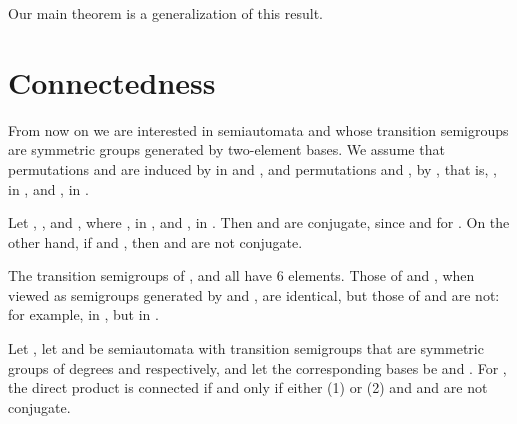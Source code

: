 \documentclass{llncs}
\newcommand{\qedb}{\hfill}
\begin{document}
Our main theorem is a generalization of this result.
\section{Connectedness}
\label{sec:connect}

From now on we are interested in semiautomata  and  whose transition semigroups are symmetric groups generated by two-element bases.
We assume that permutations  and  are induced by   in  and , and permutations  and , by  , that is,
,  in , and ,  in .

\begin{example}
Let , , and , where
,  in , 
and ,  
in .
Then  and  are conjugate, since  and
 for .
On the other hand, if   and ,  then  and  are not conjugate.


The transition semigroups of ,  and  all have 6 elements.
Those of  and , when viewed as semigroups generated by  and , are identical, but those of  and  are not: for example,
 in , but  in .
\qedb
\end{example}

\begin{theorem}
\label{thm: reach}
Let  , let  and  be 
semiautomata with transition semigroups  that are  symmetric groups  of degrees  and  respectively, and let the corresponding bases be  and .  For , the direct product  is connected if and only if either (1)  or (2)  and  and  are not conjugate. 
\end{theorem}
\end{document}
